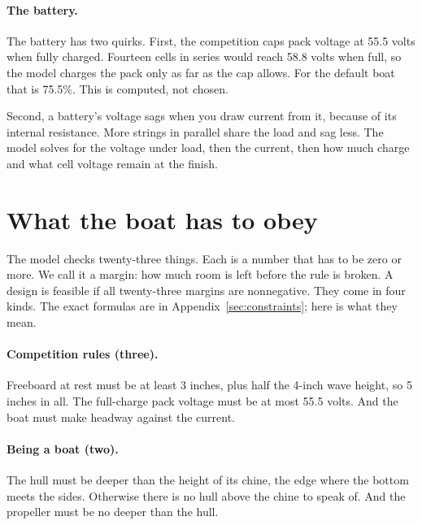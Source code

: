 \documentclass[11pt,a4paper]{article}
\renewcommand{\_}{\textunderscore\allowbreak}
\begin{document}
\paragraph{The battery.} The battery has two quirks. First, the competition caps pack voltage at 55.5 volts when fully charged. Fourteen cells in series would reach 58.8 volts when full, so the model charges the pack only as far as the cap allows.
For the default boat that is 75.5\%. This is computed, not chosen.

Second, a battery's voltage sags when you draw current from it, because of its internal resistance. More strings in parallel share the load and sag less. The model solves for the voltage under load, then the current,
then how much charge and what cell voltage remain at the finish.

\section*{What the boat has to obey}

The model checks twenty-three things. Each is a number that has to be zero or more. We call it a margin: how much room is left before the rule is broken. A design is feasible if all twenty-three margins are nonnegative.
They come in four kinds. The exact formulas are in Appendix~\ref{sec:constraints}; here is what they mean.

\paragraph{Competition rules (three).} Freeboard at rest must be at least 3 inches, plus half the 4-inch wave height, so 5 inches in all. The full-charge pack voltage must be at most 55.5 volts.
And the boat must make headway against the current.

\paragraph{Being a boat (two).} The hull must be deeper than the height of its chine, the edge where the bottom meets the sides. Otherwise there is no hull above the chine to speak of.
And the propeller must be no deeper than the hull.
\end{document}
